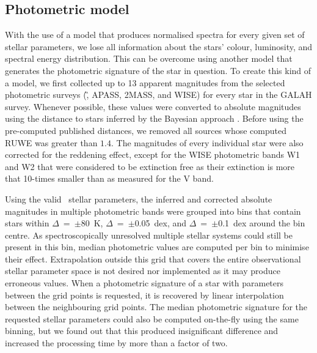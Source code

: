 \subsection{Photometric model}
\label{sec:p_model}
With the use of a model that produces normalised spectra for every given set of stellar parameters, we lose all information about the stars' colour, luminosity, and spectral energy distribution. This can be overcome using another model that generates the photometric signature of the star in question. To create this kind of a model, we first collected up to 13 apparent magnitudes from the selected photometric surveys (\G, APASS, 2MASS, and WISE) for every star in the GALAH survey. Whenever possible, these values were converted to absolute magnitudes using the distance to stars inferred by the Bayesian approach \cite{2018AJ....156...58B}. Before using the pre-computed published distances, we removed all sources whose computed RUWE was greater than $1.4$. The magnitudes of every individual star were also corrected for the reddening effect, except for the WISE photometric bands W1 and W2 that were considered to be extinction free as their extinction is more that 10-times smaller than as measured for the V band.

Using the valid \TC\ stellar parameters, the inferred and corrected absolute magnitudes in multiple photometric bands were grouped into bins that contain stars within $\Delta$\Teff~=~$\pm$80~K, $\Delta$\Logg~=~$\pm$0.05~dex, and $\Delta$\Feh~=~$\pm$0.1~dex around the bin centre. As spectroscopically unresolved multiple stellar systems could still be present in this bin, median photometric values are computed per bin to minimise their effect. Extrapolation outside this grid that covers the entire observational stellar parameter space is not desired nor implemented as it may produce erroneous values. When a photometric signature of a star with parameters between the grid points is requested, it is recovered by linear interpolation between the neighbouring grid points. The median photometric signature for the requested stellar parameters could also be computed on-the-fly using the same binning, but we found out that this produced insignificant difference and increased the processing time by more than a factor of two.

